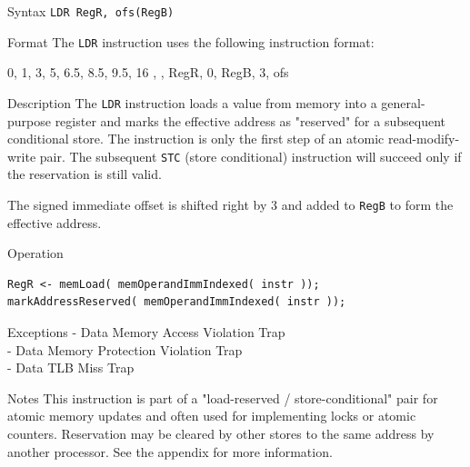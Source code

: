 %
%
\pagebreak
{}

\begin{iPageDescEntry}{Syntax}
  \texttt{LDR RegR, ofs(RegB)}
\end{iPageDescEntry}

\begin{iPageDescEntry}{Format}
    The \texttt{LDR} instruction uses the following instruction format: \\

    \begin{flushleft}
    \drawInstrFormat
        {0, 1, 3, 5, 6.5, 8.5, 9.5, 16}
        {\OpCodeGrpMEM, \OpCodeLDR, RegR, 0, RegB, 3, ofs}
    \end{flushleft}
\end{iPageDescEntry}

\begin{iPageDescEntry}{Description}
The \texttt{LDR} instruction loads a value from memory into a general-purpose register and marks the effective address as "reserved" for a subsequent conditional store. The instruction is only the first step of an atomic read-modify-write pair. The subsequent \texttt{STC} (store conditional) instruction will succeed only if the reservation is still valid.
    
    The signed immediate offset is shifted right by 3 and added to \texttt{RegB} to form the effective address.  
    
\end{iPageDescEntry}

\begin{iPageDescOpEntry}{Operation}
\begin{lstlisting}[style=iPageOpStyle]
RegR <- memLoad( memOperandImmIndexed( instr ));
markAddressReserved( memOperandImmIndexed( instr ));
\end{lstlisting}
\end{iPageDescOpEntry}

\begin{iPageDescEntry}{Exceptions}
    - Data Memory Access Violation Trap \\
    - Data Memory Protection Violation Trap \\
    - Data TLB Miss Trap
\end{iPageDescEntry}

\begin{iPageDescEntry}{Notes}
    This instruction is part of a "load-reserved / store-conditional" pair for atomic memory updates and often used for implementing locks or atomic counters. Reservation may be cleared by other stores to the same address by another processor. See the appendix for more information.
\end{iPageDescEntry}
